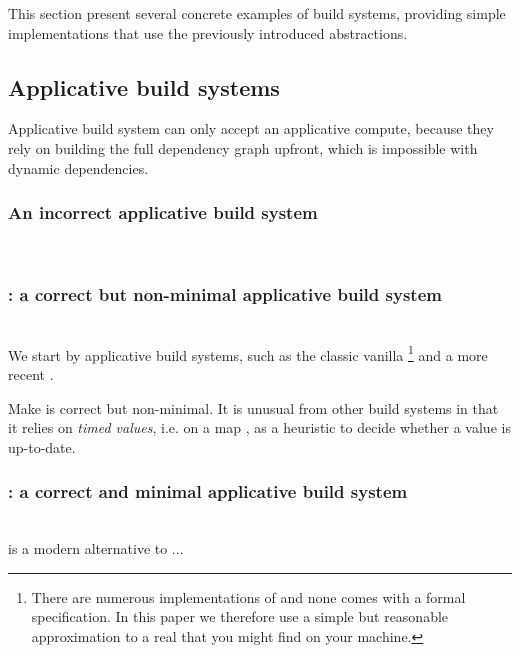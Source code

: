This section present several concrete examples of build systems, providing
simple implementations that use the previously introduced abstractions.

\subsection{Applicative build systems}

Applicative build system can only accept an applicative compute, because they
rely on building the full dependency graph upfront, which is impossible with
dynamic dependencies.

\vspace{4mm}
\subsubsection{An incorrect applicative build system}~\\


\vspace{4mm}
\subsubsection{\Make: a correct but non-minimal applicative build system}~\\
 
We start by applicative build systems, such as the classic vanilla
\Make\footnote{There are numerous implementations of \Make and none comes with a
formal specification. In this paper we therefore use a simple but reasonable
approximation to a real \Make that you might find on your machine.} and a more
recent \Ninja.

Make is correct but non-minimal. It is unusual from other build systems in that
it relies on \emph{timed values}, i.e. on a map , as a
heuristic to decide whether a value is up-to-date.


\vspace{4mm}
\subsubsection{\Ninja: a correct and minimal applicative build system}~\\

\Ninja is a modern alternative to \Make ...

